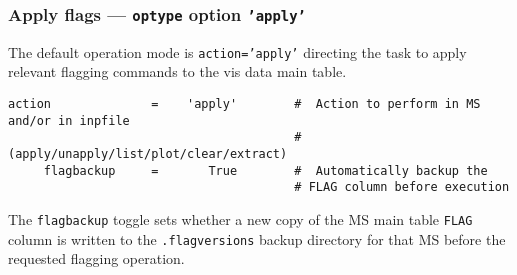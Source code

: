 \subsubsection{Apply flags --- {\tt optype} option {\tt 'apply'}}
\label{section:edit.flagcmd.action.apply}

The default operation mode is {\tt action='apply'} directing the
task to apply relevant flagging commands to the vis data main table.

\small
\begin{verbatim}
action              =    'apply'        #  Action to perform in MS and/or in inpfile
                                        #   (apply/unapply/list/plot/clear/extract)
     flagbackup     =       True        #  Automatically backup the
                                        # FLAG column before execution

\end{verbatim}
\normalsize
%
%

The {\tt flagbackup} toggle sets whether a new copy of the MS main
table {\tt FLAG} column is written to the {\tt .flagversions} backup
directory for that MS before the requested flagging operation.


